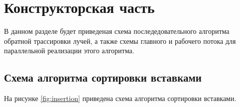 \chapter{Конструкторская часть}

В данном разделе будет приведеная схема последедовательного алгоритма обратной трассировки лучей, а также схемы главного и рабочего потока для параллельной реализации этого алгоритма.

\section{Схема алгоритма сортировки вставками}

На рисунке \ref{fig:insertion} приведена схема алгоритма сортировки вставками.

\begin{figure}[h!]
	
	

\end{figure}
